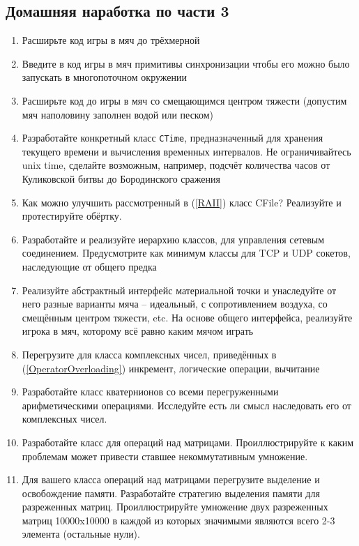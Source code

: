 \documentclass[a4paper,12pt,oneside]{article}
\begin{document}
\pagebreak
\subsection{Домашняя наработка по части 3}

\begin{enumerate}
\item
Расширьте код игры в мяч до трёхмерной 

\item
Введите в код игры в мяч примитивы синхронизации чтобы его можно было запускать в многопоточном окружении

\item
Расширьте код до игры в мяч со смещающимся центром тяжести (допустим мяч наполовину заполнен водой или песком)

\item
Разработайте конкретный класс \lstinline!CTime!, предназначенный для хранения текущего времени и вычисления временных интервалов. Не ограничивайтесь unix time, сделайте возможным, например, подсчёт количества часов от Куликовской битвы до Бородинского сражения

\item
Как можно улучшить рассмотренный в (\ref{RAII}) класс CFile? Реализуйте и протестируйте обёртку.

\item
Разработайте и реализуйте иерархию классов, для управления сетевым соединением. Предусмотрите как минимум классы для TCP и UDP сокетов, наследующие от общего предка

\item
Реализуйте абстрактный интерфейс материальной точки и унаследуйте от него разные варианты мяча -- идеальный, с сопротивлением воздуха, со смещённым центром тяжести, etc. На основе общего интерфейса, реализуйте игрока в мяч, которому всё равно каким мячом играть

\item
Перегрузите для класса комплексных чисел, приведённых в (\ref{OperatorOverloading}) инкремент, логические операции, вычитание

\item
Разработайте класс кватернионов со всеми перегруженными арифметическими операциями. Исследуйте есть ли смысл наследовать его от комплексных чисел.

\item
Разработайте класс для операций над матрицами. Проиллюстрируйте к каким проблемам может привести ставшее некоммутативным умножение.

\item
Для вашего класса операций над матрицами перегрузите выделение и освобождение памяти. Разработайте стратегию выделения памяти для разреженных матриц. Проиллюстрируйте умножение двух разреженных матриц 10000x10000 в каждой из которых значимыми являются всего 2-3 элемента (остальные нули).

\end{enumerate}
\end{document}
